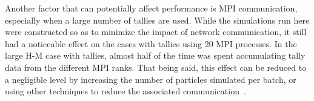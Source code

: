 \documentclass{mc2015}
\begin{document}
Another factor that can potentially affect performance is MPI communication,
especially when a large number of tallies are used. While the simulations run
here were constructed so as to minimize the impact of network communication, it
still had a noticeable effect on the cases with tallies using 20 MPI
processes. In the large H-M case with tallies, almost half of the time was
spent accumulating tally data from the different MPI ranks. That being said,
this effect can be reduced to a negligible level by increasing the number of
particles simulated per batch, or using other techniques to reduce the
associated communication~\cite{trans-romano-2012}.

\end{document}
